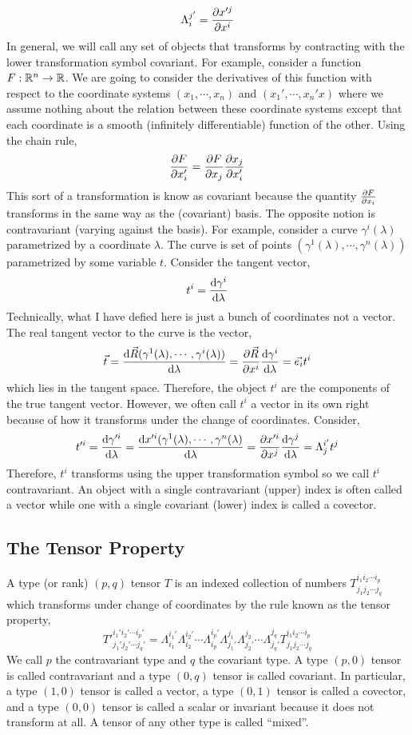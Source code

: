 \documentclass[11pt, a4paper]{article}
\begin{document}
\[ \Lambda^{j'}_{i} = \frac{\partial{x'^j}}{\partial{x^i}} \]
In general, we will call any set of objects that transforms by contracting with the lower transformation symbol covariant. For example,
consider a function $F : \mathbb{R}^n \to \mathbb{R}$. We are going to consider the derivatives of this function with respect to the coordinate systems $(x_1, \cdots, x_n)$ and $(x_1', \cdots, x_n'x)$ where we assume nothing about the relation between these coordinate systems except that each coordinate is a smooth (infinitely differentiable) function of the other. Using the chain rule,
\[ \frac{\partial{F}}{\partial{x'_i}} = \frac{\partial{F}}{\partial{x_j}} \frac{\partial{x_j}}{\partial{x'_i}} \]
This sort of a transformation is know as covariant because the quantity $\frac{\partial{F}}{\partial{x_i}}$ transforms in the same way as the (covariant) basis.
The opposite notion is contravariant (varying against the basis). For example, consider a curve $\gamma^i(\lambda)$ parametrized by a coordinate $\lambda$. The curve is set of points $(\gamma^1(\lambda), \cdots, \gamma^n(\lambda))$ parametrized by some variable $t$. Consider the tangent vector,
\[ t^i = \frac{\mathrm{d}\gamma^i}{\mathrm{d}\lambda} \]
Technically, what I have defied here is just a bunch of coordinates not a vector. The real tangent vector to the curve is the vector,
\[\vec{t} = \frac{\mathrm{d}\vec{R}(\gamma^1(\lambda), \cdots, \gamma^i(\lambda))}{\mathrm{d}\lambda} = \frac{\partial{\vec{R}}}{\partial{x^i}} \frac{\mathrm{d}\gamma^i}{\mathrm{d}\lambda} = \vec{e_i} t^i\] 
which lies in the tangent space. Therefore, the object $t^i$ are the components of the true tangent vector. However, we often call $t^i$ a vector in its own right because of how it transforms under the change of coordinates. Consider,
\[ t'^i = \frac{\mathrm{d}\gamma'^i}{\mathrm{d}\lambda} = \frac{\mathrm{d}x'^i(\gamma^1(\lambda), \cdots, \gamma^n(\lambda)}{\mathrm{d}\lambda} = \frac{\partial{x'^i}}{\partial{x^j}} \frac{\mathrm{d}\gamma^j}{\mathrm{d}\lambda} = \Lambda^{i'}_j t^j \]
Therefore, $t^i$ transforms using the upper transformation symbol so we call $t^i$ contravariant. An object with a single contravariant (upper) index is often called a vector while one with a single covariant (lower) index is called a covector. 

\subsection{The Tensor Property}

\begin{definition}
A type (or rank) $(p,q)$ tensor $T$ is an indexed collection of numbers $T^{i_1 i_2 \cdots i_p}_{j_1 j_2 \cdots j_q}$ which transforms under change of coordinates by the rule known as the tensor property,
\[ T'^{i_1' i_2' \cdots i_p'}_{j_1' j_2' \cdots j_q'} = \Lambda^{i_1'}_{i_1} \Lambda^{i_2'}_{i_2} \cdots \Lambda^{i_p'}_{i_p} \Lambda^{j_1}_{j_1'} \Lambda^{j_2}_{j_2'} \cdots \Lambda^{j_q}_{j_q'} T^{i_1 i_2 \cdots i_p}_{j_1 j_2 \cdots j_q}\]
We call $p$ the contravariant type and $q$ the covariant type. A type $(p, 0)$ tensor is called contravariant and a type $(0, q)$ tensor is called covariant. In particular, a type $(1, 0)$ tensor is called a vector, a type $(0, 1)$ tensor is called a covector, and a type $(0, 0)$ tensor is called a scalar or invariant because it does not transform at all. A tensor of any other type is called ``mixed''.
\end{definition}
\end{document}
